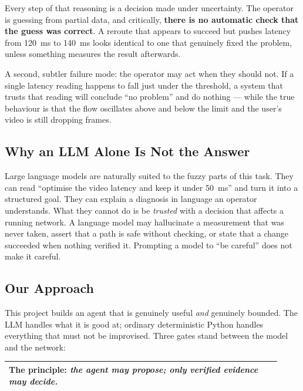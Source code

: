 \documentclass[12pt,a4paper]{report}
\begin{document}
Every step of that reasoning is a decision made under uncertainty. The operator
is guessing from partial data, and critically, \textbf{there is no automatic
check that the guess was correct}. A reroute that appears to succeed but pushes
latency from 120~ms to 140~ms looks identical to one that genuinely fixed the
problem, unless something measures the result afterwards.

A second, subtler failure mode: the operator may act when they should not. If a
single latency reading happens to fall just under the threshold, a system that
trusts that reading will conclude ``no problem'' and do nothing --- while the
true behaviour is that the flow oscillates above and below the limit and the
user's video is still dropping frames.

\subsection{Why an LLM Alone Is Not the Answer}

Large language models are naturally suited to the fuzzy parts of this task. They
can read ``optimise the video latency and keep it under 50~ms'' and turn it into
a structured goal. They can explain a diagnosis in language an operator
understands. What they cannot do is be \emph{trusted} with a decision that
affects a running network. A language model may hallucinate a measurement that
was never taken, assert that a path is safe without checking, or state that a
change succeeded when nothing verified it. Prompting a model to ``be careful''
does not make it careful.

\subsection{Our Approach}

This project builds an agent that is genuinely useful \emph{and} genuinely
bounded. The LLM handles what it is good at; ordinary deterministic Python
handles everything that must not be improvised. Three gates stand between the
model and the network:

\begin{center}
\begin{tabular}{@{}p{0.92\linewidth}@{}}
\toprule
\textbf{The principle:} \emph{the agent may propose; only verified evidence
may decide.} \\
\bottomrule
\end{tabular}
\end{center}
\end{document}
